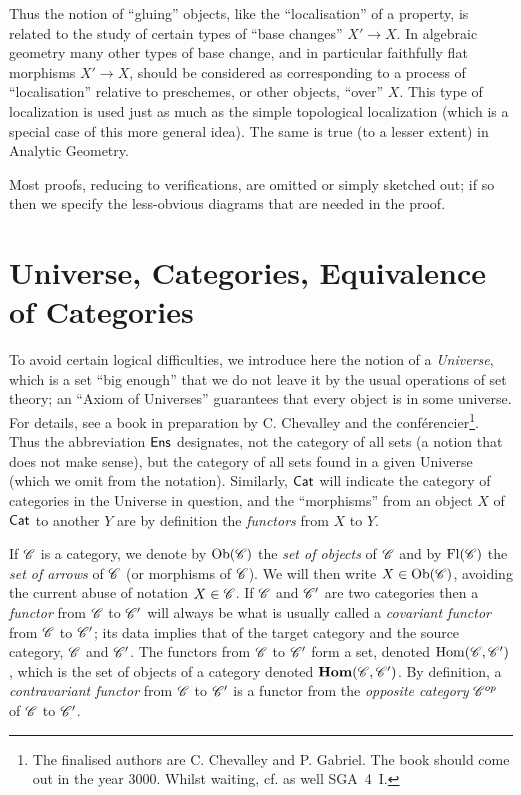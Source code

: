 Thus the notion of ``gluing'' objects, like the ``localisation'' of a property, is related to the study of certain types of ``base changes'' $X '\to X$. 
In algebraic geometry many other types of base change, and in particular faithfully flat morphisms $X '\to X$, should be considered as corresponding to a process of ``localisation'' relative to preschemes, or other objects, ``over'' $X$.
This type of localization is used just as much as the simple topological localization (which is a special case of this more general idea). 
The same is true (to a lesser extent) in Analytic Geometry. 

Most proofs, reducing to verifications, are omitted or simply sketched out; if so then we specify the less-obvious diagrams that are needed in the proof.


\section{Universe, Categories, Equivalence of Categories}

To avoid certain logical difficulties, we introduce here the notion of a \emph{Universe}, which is a set ``big enough'' that we do not leave it by the usual operations of set theory; an ``Axiom of Universes'' guarantees that every object is in some universe. 
For details, see a book in preparation by C. Chevalley and the conférencier\footnote{The finalised authors are C. Chevalley and P. Gabriel. The book should come out in the year 3000. Whilst waiting, cf. as well SGA~4~I.}. 
Thus the abbreviation $\mathsf{Ens}$ designates, not the category of all sets (a notion that does not make sense), but the category of all sets found in a given Universe (which we omit from the notation). 
Similarly, $\mathsf{Cat}$ will indicate the category of categories in the Universe in question, and the ``morphisms'' from an object $X$ of $\mathsf{Cat}$ to another $Y$ are by definition the \emph{functors} from $X$ to $Y$.

If $\mathscr{C}$ is a category, we denote by $\mathrm{Ob} (\mathscr{C})$ the \emph{set of objects} of $\mathscr{C}$ and by $\mathrm{Fl} (\mathscr{C})$ the \emph{set of arrows} of $\mathscr{C}$ (or morphisms of $\mathscr{C}$). 
We will then write $X \in \mathrm{Ob} (\mathscr{C})$, avoiding the current abuse of notation $X \in \mathscr{C}$. 
If $\mathscr{C}$ and $\mathscr{C}'$ are two categories then a \emph{functor} from $\mathscr{C}$ to $\mathscr{C}'$ will always be what is usually called a \emph{covariant functor} from $\mathscr{C}$ to $\mathscr{C}'$; its data implies that of the target category and the source category, $\mathscr{C}$ and $\mathscr{C}'$. The functors from $\mathscr{C}$ to $\mathscr{C}'$ form a set, denoted $\mathrm{Hom} (\mathscr{C}, \mathscr{C}')$, which is the set of objects of a category denoted $\textbf{Hom} (\mathscr{C}, \mathscr{C}')$.
By definition, a \emph{contravariant functor} from $\mathscr{C}$ to $\mathscr{C}'$ is a functor from the \emph{opposite category} $\mathscr{C}^{op}$ of $\mathscr{C}$ to $\mathscr{C}'$.

